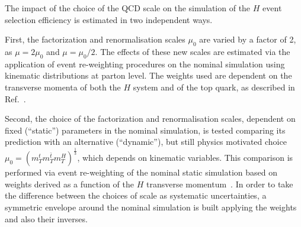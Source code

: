 The impact of the choice of the QCD scale on the simulation of the \ttbar$H$ event selection efficiency is estimated in two independent ways. 

First, the factorization and renormalisation scales $\mu_{0}$ are varied by a factor of 2, as $\mu = 2\mu_{0}$ and $\mu = \mu_{0}/2$. The effects of these new scales are estimated via the application of event re-weighting procedures on the nominal simulation using kinematic distributions at parton level. The weights used are dependent on the transverse momenta of both the \ttbar$H$ system and of the top quark, as described in Ref.~\cite{Guindon:1638000}. 

Second, the choice of the factorization and renormalisation scales, dependent on fixed (``static'') parameters in the nominal simulation, is tested comparing its prediction with an alternative (``dynamic''), but still physics motivated choice $\mu_{0} = (m_{T}^{t}m_{T}^{\bar{t}}m_{T}^{H})^{\frac{1}{3}}$, which depends on kinematic variables. This comparison is performed via event re-weighting of the nominal static simulation based on weights derived as a function of the \ttbar$H$ transverse momentum~\cite{Guindon:1638000}. In order to take the difference between the choices of scale as systematic uncertainties, a symmetric envelope around the nominal simulation is built applying the weights and also their inverses.

